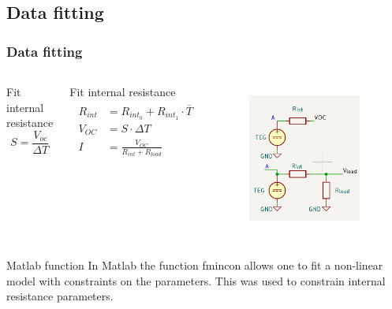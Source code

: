 \subsection{Data fitting}
\begin{frame}
    \frametitle{Data fitting}

\begin{columns}[c] %
    \begin{block}{Fit internal resistance}
        \begin{equation}
            S = \frac{V_{oc}}{\Delta T }
        \end{equation}
    \end{block}
    \begin{block}{Fit internal resistance}
        \begin{align}
            \begin{split}
            R_{int} &= R_{int_0} + R_{int_1} \cdot \overline{T} \\
            V_{OC} &= S \cdot \Delta T \\
            I &= \frac{V_{OC}}{R_{int} + R_{load}}
            \end{split}
        \end{align}
    \end{block}
\begin{figure}
    \centering
    \includegraphics[width=0.9\textwidth]{images/TEGcircuitmodel.png}
    \label{fig:enter-label}
\end{figure}
\end{columns}
\begin{block}{Matlab function}
In Matlab the function fmincon allows one to fit a non-linear model with constraints on the parameters. This was used to constrain internal resistance parameters.
\end{block}
\end{frame}

